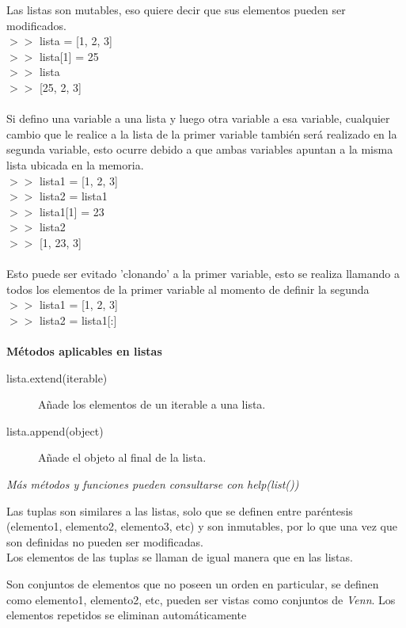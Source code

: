 \documentclass[10pt,a4paper]{article}
\begin{document}
\begin{description}[
align=right,
labelindent = 1cm,
labelsep=0.5cm,
itemindent=0cm]
        Las listas son mutables, eso quiere decir que sus elementos pueden ser modificados.\\
        $>>$ lista = [1, 2, 3]\\
        $>>$ lista[1] = 25\\
        $>>$ lista\\
        $>>$ [25, 2, 3]\\~\\
        Si defino una variable a una lista y luego otra variable a esa variable, cualquier cambio que le realice a la lista de la primer variable también será realizado en la segunda variable, esto ocurre debido a que ambas variables apuntan a la misma lista ubicada en la memoria.\\
        $>>$ lista1 = [1, 2, 3]\\
        $>>$ lista2 = lista1\\
        $>>$ lista1[1] = 23\\
        $>>$ lista2\\
        $>>$ [1, 23, 3]\\~\\
        Esto puede ser evitado 'clonando' a la primer variable, esto se realiza llamando a todos los elementos de la primer variable al momento de definir la segunda\\
        $>>$ lista1 = [1, 2, 3]\\
        $>>$ lista2 = lista1[:]\\~\\
        \textbf{Métodos aplicables en listas}
        \begin{description}
            \item [lista.extend(iterable)] Añade los elementos de un iterable a una lista.
            \item [lista.append(object)] Añade el objeto al final de la lista.
        \end{description}
        \textit{Más métodos y funciones pueden consultarse con \emph{help(list())}}
        
    \item [tuple]
        Las tuplas son similares a las listas, solo que se definen entre paréntesis (elemento1, elemento2, elemento3, etc) y son inmutables, por lo que una vez que son definidas no pueden ser modificadas.\\ Los elementos de las tuplas se llaman de igual manera que en las listas.
    
    \item [set]
        Son conjuntos de elementos que no poseen un orden en particular, se definen como {elemento1, elemento2, etc}, pueden ser vistas como conjuntos de \emph{Venn}. Los elementos repetidos se eliminan automáticamente\\
        

\end{description}
\end{document}

